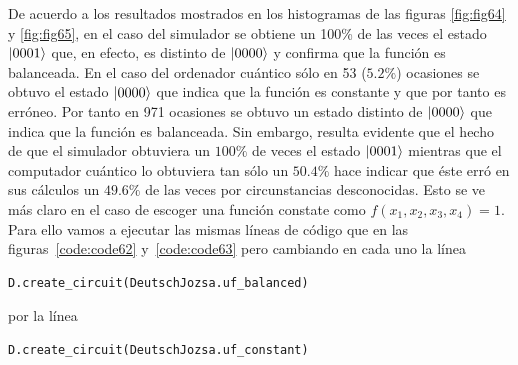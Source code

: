 De acuerdo a los resultados mostrados en los histogramas de las figuras \ref{fig:fig64} y \ref{fig:fig65}, en el caso del simulador se obtiene un 100\% de las veces el estado $\left|0001\right\rangle$ que, en efecto, es distinto de $\left|0000\right\rangle$ y confirma que la función es balanceada. En el caso del ordenador cuántico sólo en 53 ($5.2\%$) ocasiones se obtuvo el estado $\left|0000\right\rangle$ que indica que la función es constante y que por tanto es erróneo. Por tanto en 971 ocasiones se obtuvo un estado distinto de $\left|0000\right\rangle$ que indica que la función es balanceada. Sin embargo, resulta evidente que el hecho de que el simulador obtuviera un $100\%$ de veces el estado $\left|0001\right\rangle$ mientras que el computador cuántico lo obtuviera tan sólo un $50.4\%$ hace indicar que éste erró en sus cálculos un $49.6\%$ de las veces por circunstancias desconocidas. Esto se ve más claro en el caso de escoger una función constate como $f(x_1,x_2,x_3,x_4)=1$. Para ello vamos a ejecutar las mismas líneas de código que en las figuras~\ref{code:code62} y~\ref{code:code63} pero cambiando en cada uno la línea
\begin{lstlisting}[language=Python]
D.create_circuit(DeutschJozsa.uf_balanced)
\end{lstlisting}

por la línea
\begin{lstlisting}[language=Python]
D.create_circuit(DeutschJozsa.uf_constant)
\end{lstlisting}

